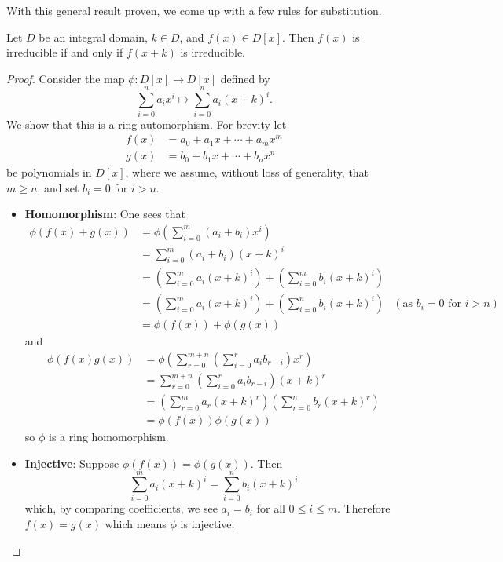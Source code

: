 With this general result proven, we come up with a few rules for substitution.

\begin{corollary}\label{corollary-irreducible-iff-translation-is-irreducible}
    Let $D$ be an integral domain, $k \in D$, and $f(x) \in D[x]$. Then $f(x)$ is irreducible if and only if $f(x + k)$ is irreducible.
\end{corollary}
\begin{proof}
    Consider the map $\phi: D[x] \to D[x]$ defined by
    \[
        \sum_{i=0}^n a_ix^i \mapsto \sum_{i=0}^na_i(x+k)^i.
    \]
    We show that this is a ring automorphism. For brevity let
    \begin{align*}
        f(x) &= a_0 + a_1x + \cdots + a_mx^m\\
        g(x) &= b_0 + b_1x + \cdots + b_nx^n
    \end{align*}
    be polynomials in $D[x]$, where we assume, without loss of generality, that $m \geq n$, and set $b_i = 0$ for $i > n$.
    \begin{itemize}
        \item \textbf{Homomorphism}: One sees that
        \begin{align*}
            \phi(f(x) + g(x)) &= \phi\left(\sum_{i=0}^m(a_i+b_i)x^i\right)\\
            &= \sum_{i=0}^m(a_i+b_i)(x+k)^i\\
            &= \left(\sum_{i=0}^ma_i(x+k)^i\right) + \left(\sum_{i=0}^mb_i(x+k)^i\right)\\
            &= \left(\sum_{i=0}^ma_i(x+k)^i\right) + \left(\sum_{i=0}^nb_i(x+k)^i\right) & (\text{as } b_i = 0 \text{ for } i > n)\\
            &= \phi(f(x)) + \phi(g(x))
        \end{align*}
        and
        \begin{align*}
            \phi(f(x)g(x)) &= \phi\left(\sum_{r=0}^{m+n}\left(\sum_{i=0}^ra_ib_{r-i}\right)x^r\right)\\
            &= \sum_{r=0}^{m+n}\left(\sum_{i=0}^ra_ib_{r-i}\right)(x+k)^r\\
            &= \left(\sum_{r=0}^ma_r(x+k)^r\right)\left(\sum_{r=0}^nb_r(x+k)^r\right)\\
            &= \phi(f(x))\phi(g(x))
        \end{align*}
        so $\phi$ is a ring homomorphism.

        \item \textbf{Injective}: Suppose $\phi(f(x)) = \phi(g(x))$. Then
        \[
            \sum_{i=0}^ma_i(x+k)^i = \sum_{i=0}^nb_i(x+k)^i
        \]
        which, by comparing coefficients, we see $a_i = b_i$ for all $0 \leq i \leq m$. Therefore $f(x) = g(x)$ which means $\phi$ is injective.


\end{itemize}
\end{proof}
